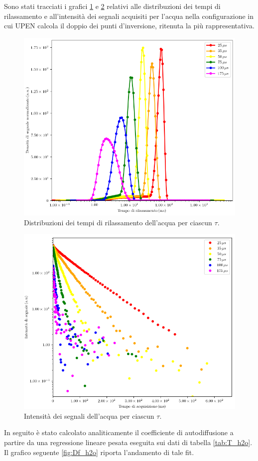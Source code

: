 Sono stati tracciati i grafici \ref{fig:D_h2o} e \ref{fig:S_h2o} relativi alle distribuzioni dei tempi di rilassamento e all'intensità dei segnali acquisiti per l'acqua nella configurazione in cui UPEN calcola il doppio dei punti d'inversione, ritenuta la più rappresentativa.

\begin{figure}[h!]
\centering
\includegraphics[width=\columnwidth]{Figure/H2O.png}
\caption{Distribuzioni dei tempi di rilassamento dell'acqua per ciascun $\tau$.}
\label{fig:D_h2o}
\end{figure}

\begin{figure}[h!]
\centering
\includegraphics[width=\columnwidth]{Figure/H2O_SigTSig.png}
\caption{Intensità dei segnali dell'acqua per ciascun $\tau$.}
\label{fig:S_h2o}
\end{figure}
\newpage
In seguito è stato calcolato analiticamente il coefficiente di autodiffusione a partire da una regressione lineare pesata eseguita sui dati di tabella \ref{tab:T_h2o}.
Il grafico seguente \ref{fig:Df_h2o} riporta l'andamento di tale fit.

